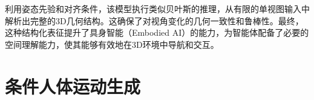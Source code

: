 \documentclass[../../book-main_zh.tex]{subfiles}
\begin{document}
利用姿态先验和对齐条件，该模型执行类似贝叶斯的推理，从有限的单视图输入中解析出完整的3D几何结构。这确保了对视角变化的几何一致性和鲁棒性。最终，这种结构化表征提升了具身智能（Embodied AI）的能力，为智能体配备了必要的空间理解能力，使其能够有效地在3D环境中导航和交互。

\section{条件人体运动生成}
\label{sec:egoallo}

%


\end{document}

